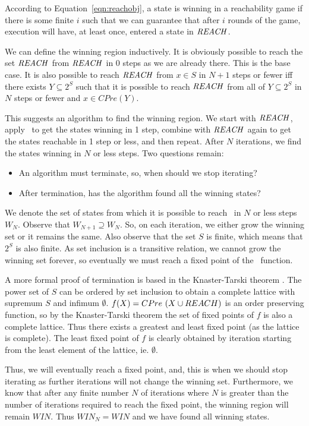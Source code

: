 According to Equation~\ref{eqn:reachobj}, a state is winning in a reachability game if there is some finite $i$ such that we can guarantee that after $i$ rounds of the game, execution will have, at least once, entered a state in $\mathit{REACH}$. 

We can define the winning region inductively. It is obviously possible to reach the set $\mathit{REACH}$ from $\mathit{REACH}$ in 0 steps as we are already there. This is the base case. It is also possible to reach $\mathit{REACH}$ from $x \in S$ in $N + 1$ steps or fewer iff there exists $Y\subseteq 2^S$ such that it is possible to reach $\mathit{REACH}$ from all of $Y \subseteq 2^S$ in $N$ steps or fewer and $x \in CPre(Y)$.

This suggests an algorithm to find the winning region. We start with $\mathit{REACH}$, apply \cpre\ to get the states winning in 1 step, combine with $\mathit{REACH}$ again to get the states reachable in 1 step or less, and then repeat. After $N$ iterations, we find the states winning in $N$ or less steps. Two questions remain: 

\begin{itemize}
    \item An algorithm must terminate, so, when should we stop iterating?
    \item After termination, has the algorithm found all the winning states?
\end{itemize}

We denote the set of states from which it is possible to reach \reach\ in $N$ or less steps $W_N$. Observe that $W_{N+1} \supseteq W_N$. So, on each iteration, we either grow the winning set or it remains the same. Also observe that the set $S$ is finite, which means that $2^S$ is also finite. As set inclusion is a transitive relation, we cannot grow the winning set forever, so eventually we must reach a fixed point of the \cpre\ function. 

A more formal proof of termination is based in the Knaster-Tarski theorem \cite{tarski1955}. The power set of $S$ can be ordered by set inclusion to obtain a complete lattice with supremum $S$ and infimum $\emptyset$. $f(X) = CPre\ (X \cup REACH)$ is an order preserving function, so by the Knaster-Tarski theorem the set of fixed points of $f$ is also a complete lattice. Thus there exists a greatest and least fixed point (as the lattice is complete). The least fixed point of $f$ is clearly obtained by iteration starting from the least element of the lattice, ie. $\emptyset$. 

Thus, we will eventually reach a fixed point, and, this is when we should stop iterating as further iterations will not change the winning set. Furthermore, we know that after any finite number $N$ of iterations where $N$ is greater than the number of iterations required to reach the fixed point, the winning region will remain $WIN$. Thus $WIN_N = WIN$ and we have found all winning states.

